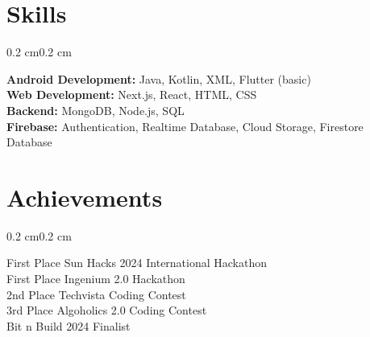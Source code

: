\documentclass[10pt, letterpaper]{article}
\newenvironment{onecolentry}{
    \begin{adjustwidth}{0.2 cm}{0.2 cm}
}{
    \end{adjustwidth}
}
\begin{document}
\section{Skills}
\begin{onecolentry}
    \textbf{Android Development:} Java, Kotlin, XML, Flutter (basic)\\
    \textbf{Web Development:} Next.js, React, HTML, CSS\\
    \textbf{Backend:} MongoDB, Node.js, SQL\\
    \textbf{Firebase:} Authentication, Realtime Database, Cloud Storage, Firestore Database
\end{onecolentry}

\section{Achievements}
\begin{onecolentry}
    First Place Sun Hacks 2024 International Hackathon\\
    First Place Ingenium 2.0 Hackathon\\
    2nd Place Techvista Coding Contest\\
    3rd Place Algoholics 2.0 Coding Contest\\
    Bit n Build 2024 Finalist
\end{onecolentry}
\end{document}
